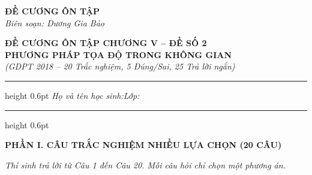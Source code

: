 \documentclass[12pt,a4paper]{article}
\begin{document}
\thispagestyle{firstpage}

\noindent
\begin{minipage}[t]{0.36\textwidth}
    \centering
    {\fontsize{12}{14}\selectfont\textbf{ĐỀ CƯƠNG ÔN TẬP}}\\[4pt]
    \textit{Biên soạn: Dương Gia Bảo}\\[6pt]
    \setlength{\fboxrule}{0.8pt}
    \setlength{\fboxsep}{5pt}
\end{minipage}\hfill
\begin{minipage}[t]{0.62\textwidth}
    \centering
    {\fontsize{13}{15}\selectfont\textbf{ĐỀ CƯƠNG ÔN TẬP CHƯƠNG V -- ĐỀ SỐ 2}}\\[3pt]
    {\fontsize{12}{14}\selectfont\textbf{PHƯƠNG PHÁP TỌA ĐỘ TRONG KHÔNG GIAN}}\\[3pt]
    {\fontsize{11}{13}\selectfont\textit{(GDPT 2018 -- 20 Trắc nghiệm, 5 Đúng/Sai, 25 Trả lời ngắn)}}
\end{minipage}

\par\vspace{4pt}
\hrule height 0.6pt
\vspace{4pt}
\noindent\textit{Họ và tên học sinh:}\dotfill\hspace{0.8cm}\textit{Lớp:}\makebox[3.2cm]{\dotfill}
\par\vspace{3pt}
\hrule height 0.6pt
\vspace{6pt}

\begin{center}
    {\fontsize{13}{15}\selectfont\textbf{PHẦN I. CÂU TRẮC NGHIỆM NHIỀU LỰA CHỌN (20 CÂU)}}
\end{center}
\textit{Thí sinh trả lời từ Câu 1 đến Câu 20. Mỗi câu hỏi chỉ chọn một phương án.}
\end{document}
